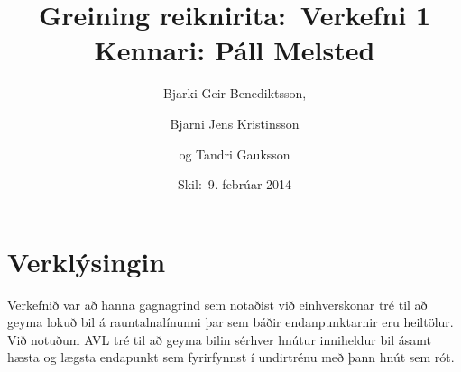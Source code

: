 \documentclass[a4paper,oneside]{article}
\title{
    Greining reiknirita:\ Verkefni 1
    \\\small{Kennari: Páll Melsted}
}
\author{Bjarki Geir Benediktsson, \and  Bjarni Jens Kristinsson \and og Tandri Gauksson}
\date{\small{Skil:\ 9. febrúar 2014}}
\begin{document}
\maketitle

\section{Verklýsingin}
Verkefnið var að hanna gagnagrind sem notaðist við einhverskonar tré til að geyma lokuð bil  á rauntalnalínunni þar sem báðir endanpunktarnir eru heiltölur.
Við notuðum AVL tré til að geyma bilin sérhver hnútur inniheldur bil ásamt hæsta og lægsta endapunkt sem fyrirfynnst í undirtrénu með þann hnút sem rót.
 
\end{document}
